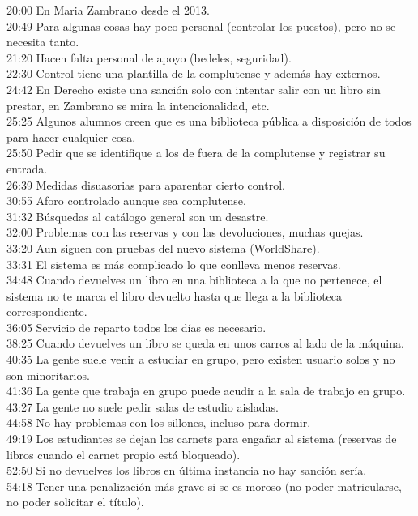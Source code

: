 \documentclass[12pt]{article}
\begin{document}
20:00 En Maria Zambrano desde el 2013.\\
20:49 Para algunas cosas hay poco personal (controlar los puestos), pero no se necesita tanto.\\
21:20 Hacen falta personal de apoyo (bedeles, seguridad).\\
22:30 Control tiene una plantilla de la complutense y además hay externos.\\
24:42 En Derecho existe una sanción solo con intentar salir con un libro sin prestar, en Zambrano se mira la intencionalidad, etc.\\
25:25 Algunos alumnos creen que es una biblioteca pública a disposición de todos para hacer cualquier cosa.\\
25:50 Pedir que se identifique a los de fuera de la complutense y registrar su entrada.\\
26:39 Medidas disuasorias para aparentar cierto control.\\
30:55 Aforo controlado aunque sea complutense.\\
31:32 Búsquedas al catálogo general son un desastre.\\
32:00 Problemas con las reservas y con las devoluciones, muchas quejas.\\
33:20 Aun siguen con pruebas del nuevo sistema (WorldShare).\\
33:31 El sistema es más complicado lo que conlleva menos reservas.\\
34:48 Cuando devuelves un libro en una biblioteca a la que no pertenece, el sistema no te marca el libro devuelto hasta que llega a la biblioteca correspondiente.\\
36:05 Servicio de reparto todos los días es necesario.\\
38:25 Cuando devuelves un libro se queda en unos carros al lado de la máquina.\\
40:35 La gente suele venir a estudiar en grupo, pero existen usuario solos y no son minoritarios. \\
41:36 La gente que trabaja en grupo puede acudir a la sala de trabajo en grupo.\\
43:27 La gente no suele pedir salas de estudio aisladas.\\
44:58 No hay problemas con los sillones, incluso para dormir.\\
49:19 Los estudiantes se dejan los carnets para engañar al sistema (reservas de libros cuando el carnet propio está bloqueado).\\
52:50 Si no devuelves los libros en última instancia no hay sanción sería.\\
54:18 Tener una penalización más grave si se es moroso (no poder matricularse, no poder solicitar el título).\\
\end{document}
